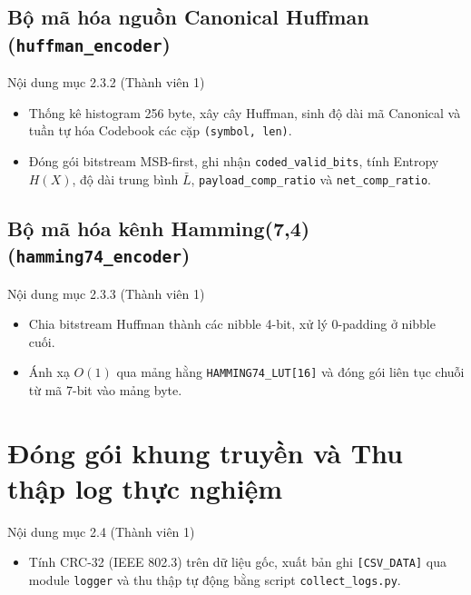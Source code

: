 \documentclass[12pt,a4paper]{report}
\begin{document}
\subsection{Bộ mã hóa nguồn Canonical Huffman (\texttt{huffman\_encoder})}
\begin{notebox}{Nội dung mục 2.3.2 (Thành viên 1)}
\begin{itemize}[leftmargin=*,nosep]
    \item Thống kê histogram 256 byte, xây cây Huffman, sinh độ dài mã Canonical và tuần tự hóa Codebook các cặp \texttt{(symbol, len)}.
    \item Đóng gói bitstream MSB-first, ghi nhận \texttt{coded\_valid\_bits}, tính Entropy $H(X)$, độ dài trung bình $\bar{L}$, \texttt{payload\_comp\_ratio} và \texttt{net\_comp\_ratio}.
\end{itemize}
\end{notebox}

\subsection{Bộ mã hóa kênh Hamming(7,4) (\texttt{hamming74\_encoder})}
\begin{notebox}{Nội dung mục 2.3.3 (Thành viên 1)}
\begin{itemize}[leftmargin=*,nosep]
    \item Chia bitstream Huffman thành các nibble 4-bit, xử lý 0-padding ở nibble cuối.
    \item Ánh xạ $O(1)$ qua mảng hằng \texttt{HAMMING74\_LUT[16]} và đóng gói liên tục chuỗi từ mã 7-bit vào mảng byte.
\end{itemize}
\end{notebox}

\section{Đóng gói khung truyền và Thu thập log thực nghiệm}
\begin{notebox}{Nội dung mục 2.4 (Thành viên 1)}
\begin{itemize}[leftmargin=*,nosep]
    \item Tính CRC-32 (IEEE 802.3) trên dữ liệu gốc, xuất bản ghi \texttt{[CSV\_DATA]} qua module \texttt{logger} và thu thập tự động bằng script \texttt{collect\_logs.py}.
\end{itemize}
\end{notebox}
\end{document}

